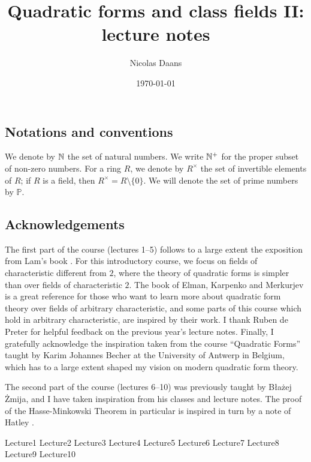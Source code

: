 \documentclass[12pt, leqno, british]{amsart}
\title{Quadratic forms and class fields II: lecture notes}
\author{Nicolas Daans}
\date{\today}
\begin{document}
\maketitle
\tableofcontents

\subsection*{Notations and conventions}
We denote by $\mathbb N$ the set of natural numbers.
We write $\mathbb N^+$ for the proper subset of non-zero numbers.
For a ring $R$, we denote by $R^\times$ the set of invertible elements of $R$; if $R$ is a field, then $R^\times = R \setminus \lbrace 0 \rbrace$.
We will denote the set of prime numbers by $\mathbb{P}$.

\subsection*{Acknowledgements}
The first part of the course (lectures 1--5) follows to a large extent the exposition from Lam's book \autocite{Lam}.
For this introductory course, we focus on fields of characteristic different from $2$, where the theory of quadratic forms is simpler than over fields of characteristic $2$.
The book of Elman, Karpenko and Merkurjev \autocite{ElmanKarpenkoMerkurjev} is a great reference for those who want to learn more about quadratic form theory over fields of arbitrary characteristic, and some parts of this course which hold in arbitrary characteristic, are inspired by their work.
I thank Ruben de Preter for helpful feedback on the previous year's lecture notes.
Finally, I gratefully acknowledge the inspiration taken from the course ``Quadratic Forms'' taught by Karim Johannes Becher at the University of Antwerp in Belgium, which has to a large extent shaped my vision on modern quadratic form theory.

The second part of the course (lectures 6--10) was previously taught by B{\l}a{\.z}ej {\.Z}mija, and I have taken inspiration from his classes and lecture notes.
The proof of the Hasse-Minkowski Theorem in particular is inspired in turn by a note of Hatley \cite{Hat}.

{Lecture1}
{Lecture2}
{Lecture3}
{Lecture4}
{Lecture5}
{Lecture6}
{Lecture7}
{Lecture8}
{Lecture9}
{Lecture10}

\printindex
\printbibliography
\end{document}
